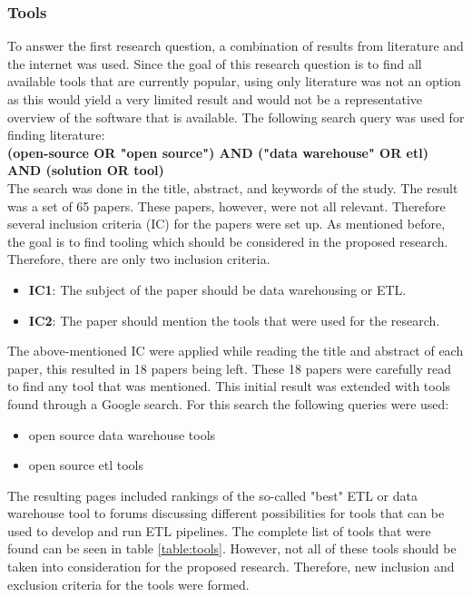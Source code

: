 \documentclass[11pt]{article}
\begin{document}
\subsubsection{Tools}
\label{searchstrat:tools}
To answer the first research question, a combination of results from literature and the internet was used. Since the goal of this research question is to find all available tools that are currently popular, using only literature was not an option as this would yield a very limited result and would not be a representative overview of the software that is available. The following search query was used for finding literature: \\

\textbf{(open-source OR "open source") AND ("data warehouse" OR etl) AND (solution OR tool)}\\

The search was done in the title, abstract, and keywords of the study. The result was a set of 65 papers. These papers, however, were not all relevant. Therefore several inclusion criteria (IC) for the papers were set up. As mentioned before, the goal is to find tooling which should be considered in the proposed research. Therefore, there are only two inclusion criteria.

\begin{itemize}
    \item \textbf{IC1}: The subject of the paper should be data warehousing or ETL.
    \item \textbf{IC2}: The paper should mention the tools that were used for the research.
\end{itemize}

The above-mentioned IC were applied while reading the title and abstract of each paper, this resulted in 18 papers being left. These 18 papers were carefully read to find any tool that was mentioned. This initial result was extended with tools found through a Google search. For this search the following queries were used:

\begin{itemize}
    \item open source data warehouse tools
    \item open source etl tools
\end{itemize}

The resulting pages included rankings of the so-called "best" ETL or data warehouse tool to forums discussing different possibilities for tools that can be used to develop and run ETL pipelines. The complete list of tools that were found can be seen in table \ref{table:tools}. However, not all of these tools should be taken into consideration for the proposed research. Therefore, new inclusion and exclusion criteria for the tools were formed.
\end{document}
